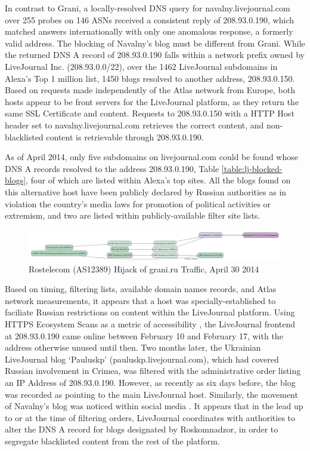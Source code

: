 In contrast to Grani, a locally-resolved DNS query for navalny.livejournal.com
over 255 probes on 146 ASNs received a consistent reply of 208.93.0.190, which
matched answers internationally with only one anomalous response, a formerly valid
address. The blocking of Navalny's blog must be different from Grani. While the
returned DNS A record of 208.93.0.190 falls within a network prefix owned by
LiveJournal Inc. (208.93.0.0/22), over the 1462 LiveJournal subdomains in
Alexa's Top 1 million list, 1450 blogs resolved to another address, 208.93.0.150.
Based on requests made independently of the Atlas network from Europe, both hosts appear to be front servers for the LiveJournal platform, as they return
the same SSL Certificate and content. Requests to 208.93.0.150
with a HTTP Host header set to navalny.livejournal.com retrieves the correct
content, and non-blacklisted content is retrievable through 208.93.0.190.

As of April 2014, only five subdomains on livejournal.com could be found whose
DNS A records resolved to the address 208.93.0.190, Table
\ref{table:lj-blocked-blogs}, four of which are listed within Alexa's top sites. All
the blogs found on this alternative host have been publicly declared by Russian
authorities as in violation the country's media laws for promotion of political
activities or extremism, and two are listed within publicly-available filter
site lists. 

\begin{figure}
  \includegraphics[width=\textwidth]{diagrams/atlas_cache-results-measurement_id-1663748.png}
  \caption{Rostelecom (AS12389) Hijack of grani.ru Traffic, April 30 2014}
  \label{image:ru-grani-hijack}
\end{figure}

Based on timing, filtering lists, available domain names records,
and Atlas network measurements, it appears that a host was specially-established 
to faciliate Russian restrictions on content within the LiveJournal platform. 
Using HTTPS Ecosystem Scans as a metric of accessibility
\cite{projectsonar}, the LiveJournal frontend at 208.93.0.190 came online
between February 10 and February 17, with the address otherwise unused until
then. Two months later, the Ukrainian LiveJournal blog `Pauluskp'
(pauluskp.livejournal.com), which had covered Russian involvement in Crimea,
was filtered with the administrative order listing an IP Address of
208.93.0.190. However, as recently as six days before, the blog was recorded as
pointing to the main LiveJournal host. Similarly, the movement of Navalny's
blog was noticed within social media \cite{miptru2014}. It appears that in the
lead up to or at the time of filtering orders, LiveJournal coordinates with
authorities to alter the DNS A record for blogs designated by Roskomnadzor, in
order to segregate blacklisted content from the rest of the platform.

